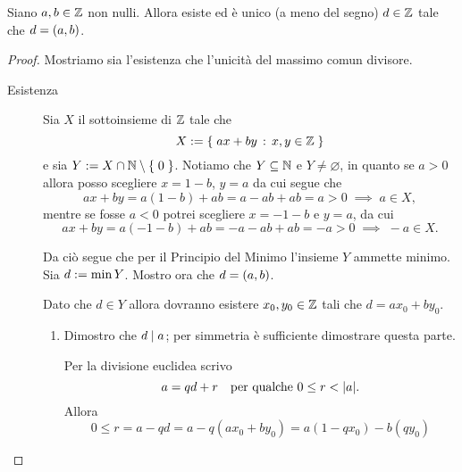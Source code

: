 \begin{theorem}
    Siano $a, b \in \mathbb{Z}$ non nulli. Allora esiste ed è unico (a meno del segno) $d \in \mathbb{Z}$ tale che $d = \left(a, b\right)$.
\end{theorem}
\begin{proof}
    Mostriamo sia l'esistenza che l'unicità del massimo comun divisore.
    \begin{description}
        \item[Esistenza] Sia $X$ il sottoinsieme di $\mathbb{Z}$ tale che \[
            X := \left\{\;ax + by \,:\, x, y \in \mathbb{Z}\;\right\}    
        \] e sia $Y := X \cap \mathbb{N} \setminus \left\{\;0\;\right\}$. Notiamo che $Y \subseteq \mathbb{N}$ e $Y \neq \varnothing$, in quanto se $a > 0$ allora posso scegliere $x = 1 - b$, $y = a$ da cui segue che \[
            ax + by = a(1-b)+ab = a - ab + ab = a > 0 \; \implies \; a \in X,
        \] mentre se fosse $a < 0$ potrei scegliere $x = - 1 - b$ e $y = a$, da cui \[
            ax + by = a(-1-b)+ab = -a - ab + ab = -a > 0 \; \implies \; -a \in X.
        \]

        Da ciò segue che per il Principio del Minimo l'insieme $Y$ ammette minimo. Sia $d := \min Y$. Mostro ora che $d = \left(a, b\right)$.

        Dato che $d \in Y$ allora dovranno esistere $x_0, y_0 \in \mathbb{Z}$ tali che $d = ax_0 + by_0$.
        \begin{enumerate}[label={(\roman*)}]
            \item Dimostro che $d \mid a$; per simmetria è sufficiente dimostrare questa parte.
            
            Per la divisione euclidea scrivo \begin{equation}
                a = qd + r \quad \text{per qualche } 0 \leq r < \lvert a\rvert.
            \end{equation} Allora \begin{equation*}
                0 \leq r = a - qd = a - q(ax_0 + by_0) = a(1 - qx_0) - b(qy_0)
            \end{equation*}
        \end{enumerate}
    \end{description}
\end{proof}